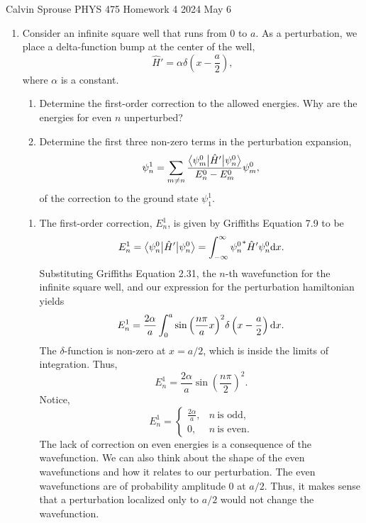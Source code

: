 \documentclass[a4paper, 12pt]{config/homework}
\begin{document}
\noindent
\hfill Calvin Sprouse \hfill PHYS 475 Homework 4 \hfill 2024 May 6 \hfill
\bigskip

\begin{enumerate}
\item Consider an infinite square well that runs from 0 to \(a\). As a perturbation, we place a delta-function bump at the center of the well,
\[\hat{H}' = \alpha\delta\left(x-\frac{a}{2}\right),\]
where \(\alpha\) is a constant.
\begin{enumerate}[label=(\alph*)]
\item Determine the first-order correction to the allowed energies. Why are the energies for even \(n\) unperturbed?
\item Determine the first three non-zero terms in the perturbation expansion,
\[\psi^1_n = \sum_{m\ne n}\frac{\bra*{\psi_m^0}\hat{H}'\ket*{\psi_n^0}}{E_n^0-E_m^0}\psi_m^0,\]
of the correction to the ground state \(\psi_1^1\).
\end{enumerate}
\bigskip
\begin{enumerate}[label=(\alph*)]
\item The first-order correction, \(E_n^1\), is given by Griffiths Equation 7.9 to be
\[E_n^1 = \bra*{\psi_n^0}\hat{H}'\ket*{\psi_n^0} = \defint{-\infty}{\infty}{{\psi_n^0}^* \hat{H}' \psi_n^0}{x}.\]
Substituting Griffiths Equation 2.31, the \(n\)-th wavefunction for the infinite square well, and our expression for the perturbation hamiltonian yields
\[E_n^1 = \frac{2\alpha}{a} \int_{0}^{a}{{\sin\left(\frac{n\pi}{a}x\right)}^2 \delta\left(x-\frac{a}{2}\right) \text{d}x}.\]
The \(\delta\)-function is non-zero at \(x=a/2\), which is inside the limits of integration. Thus,
\[E_n^1 = \frac{2\alpha}{a} {\sin\left(\frac{n\pi}{2}\right)}^2.\]
Notice,
\[E_n^1 = \begin{cases}\frac{2\alpha}{a}, & n\ \text{is odd}, \\ 0, & n\ \text{is even}.\end{cases}\]
The lack of correction on even energies is a consequence of the wavefunction. We can also think about the shape of the even wavefunctions and how it relates to our perturbation. The even wavefunctions are of probability amplitude 0 at \(a/2\). Thus, it makes sense that a perturbation localized only to \(a/2\) would not change the wavefunction.


\end{enumerate}
\end{enumerate}
\end{document}
